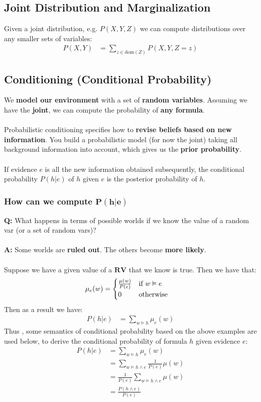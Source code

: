 \documentclass{article}
\def\blu#1{{\color{blu}#1}}
\def\gre#1{{\color{gre}#1}}
\def\red#1{{\color{red}#1}}
\begin{document}
\subsection*{Joint Distribution and Marginalization}
Given a joint distribution, e.g. $ P(X,Y, Z) $ we can compute distributions over any smaller sets of variables:
\begin{align*}
P(X,Y) &= \sum_{z \in \text{dom}(Z)} P(X, Y, Z = z)
\end{align*}

\subsection*{Conditioning (Conditional Probability)}
We \textbf{model our environment} with a set of \textbf{random variables}. Assuming we have the \textbf{\blu{joint}}, we can compute the probability of \textbf{\blu{any formula}}.\\
\\
Probabilistic conditioning specifies how to \textbf{revise beliefs based on new information}. You build a probabilistic model (for now the joint) taking all background information into account, which gives us the \blu{\textbf{prior probability}}. \\
\\
If evidence \blu{$ e $} is all the new information obtained subsequently, the \blu{conditional probability} $ P(h | e) $ of $ h $ given $ e $ is the \blu{posterior probability} of $ h $.

\subsubsection*{How can we compute $ \mathbf{P(h|e)} $}
\textbf{Q:} What happens in terms of possible worlds if we know the value of a random var (or a set of random vars)? \\
\\
\textbf{A:} Some worlds are \red{\textbf{ruled out}}. The others become \gre{\textbf{more likely}}.\\
\\
Suppose we have a given value of a $ \mathbf{RV} $ that we know is true. Then we have that:
\begin{align*}
\mu_e(w) &= \begin{cases}
	\frac{\mu(w)}{P(e)}  & \text{if $ w \vDash e $} \\
	0 & \text{otherwise}
\end{cases} 
\end{align*}
Then as a result we have:
\begin{align*}
P(h|e) &= \sum_{w \vDash h} \mu_e(w)
\end{align*}
Thus , some semantics of conditional probability based on the above examples are used below, to derive the conditional probability of formula $ h $ given evidence $ e $:
\begin{align*}
P(h|e) &= \sum_{w \vDash h} \mu_e(w) \\
&= \sum_{w \vDash h \land e} \frac{1}{P(e)}\mu(w) \\
&= \frac{1}{P(e)} \sum_{w \vDash h \land e} \mu(w) \\
&= \frac{P(h \land e)}{P(e)}
\end{align*}
\end{document}
